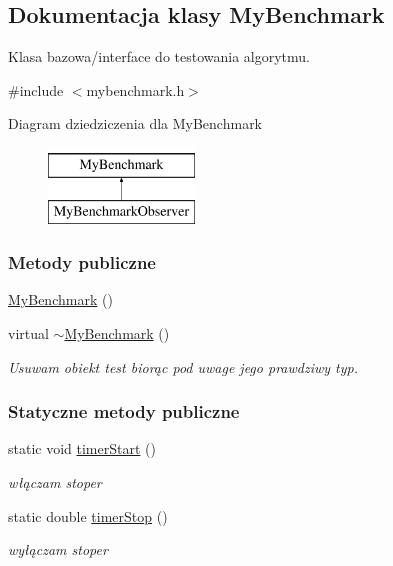 \hypertarget{class_my_benchmark}{\subsection{Dokumentacja klasy My\-Benchmark}
\label{class_my_benchmark}
}


Klasa bazowa/interface do testowania algorytmu.  




{\ttfamily \#include $<$mybenchmark.\-h$>$}

Diagram dziedziczenia dla My\-Benchmark\begin{figure}[H]
\begin{center}
\leavevmode
\includegraphics[height=2.000000cm]{class_my_benchmark}
\end{center}
\end{figure}
\subsubsection*{Metody publiczne}
\begin{DoxyCompactItemize}
\item 
\hyperlink{class_my_benchmark_a7f3739e8b61939627c0f63948a9975ca}{My\-Benchmark} ()
\item 
virtual \hyperlink{class_my_benchmark_a00de82c40680b41065eb402ac90f1736}{$\sim$\-My\-Benchmark} ()
\begin{DoxyCompactList}\small\item\em Usuwam obiekt test biorąc pod uwage jego prawdziwy typ. \end{DoxyCompactList}\end{DoxyCompactItemize}
\subsubsection*{Statyczne metody publiczne}
\begin{DoxyCompactItemize}
\item 
static void \hyperlink{class_my_benchmark_a802577db97fd440a3920add30c35a676}{timer\-Start} ()
\begin{DoxyCompactList}\small\item\em włączam stoper \end{DoxyCompactList}\item 
static double \hyperlink{class_my_benchmark_a7e3fa28fab999435bd4c51d915e42809}{timer\-Stop} ()
\begin{DoxyCompactList}\small\item\em wyłączam stoper \end{DoxyCompactList}\end{DoxyCompactItemize}
